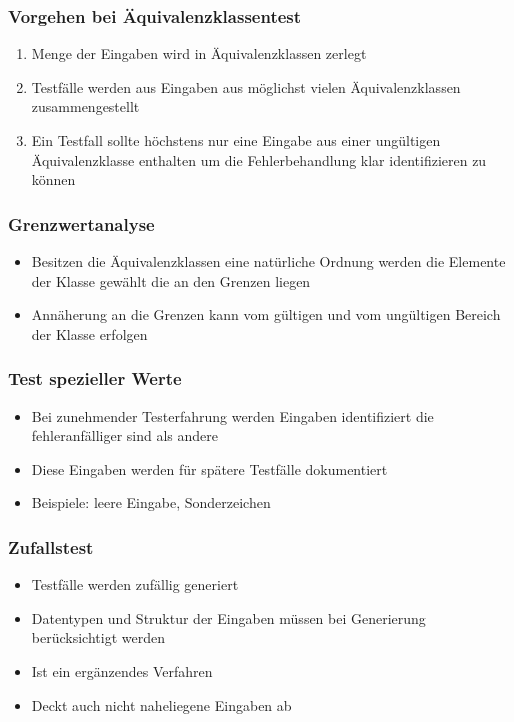\begin{frame}
\frametitle{Vorgehen bei Äquivalenzklassentest}
	\begin{enumerate}
		\item Menge der Eingaben wird in Äquivalenzklassen zerlegt
		\item Testfälle werden aus Eingaben aus möglichst vielen Äquivalenzklassen zusammengestellt
		\item Ein Testfall sollte höchstens nur eine Eingabe aus einer ungültigen Äquivalenzklasse
					enthalten um die Fehlerbehandlung klar identifizieren zu können
	\end{enumerate}
\end{frame}

\begin{frame}
\frametitle{Grenzwertanalyse}
	\begin{itemize}
		\item Besitzen die Äquivalenzklassen eine natürliche Ordnung werden die Elemente der Klasse
					gewählt die an den Grenzen liegen
		\item Annäherung an die Grenzen kann vom gültigen und vom ungültigen Bereich der Klasse erfolgen
	\end{itemize}
\end{frame}

\begin{frame}
\frametitle{Test spezieller Werte}
	\begin{itemize}
		\item Bei zunehmender Testerfahrung werden Eingaben identifiziert die fehleranfälliger sind
					als andere
		\item Diese Eingaben werden für spätere Testfälle dokumentiert
		\item Beispiele: leere Eingabe, Sonderzeichen
	\end{itemize}
\end{frame}

\begin{frame}
\frametitle{Zufallstest}
	\begin{itemize}
		\item Testfälle werden zufällig generiert
		\item Datentypen und Struktur der Eingaben müssen bei Generierung berücksichtigt werden
		\item Ist ein ergänzendes Verfahren
		\item Deckt auch nicht naheliegene Eingaben ab
	\end{itemize}
\end{frame}

